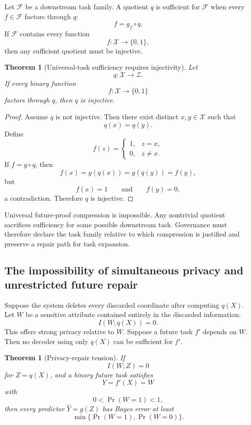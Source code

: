 \documentclass[11pt]{article}
\newtheorem{theorem}[definition]{Theorem}
\theoremstyle{definition}
\DeclareMathOperator{\Prob}{Pr}
\begin{document}
Let \(\mathcal{F}\) be a downstream task family. A quotient \(q\) is sufficient for \(\mathcal{F}\) when every \(f\in\mathcal{F}\) factors through \(q\):
\[
f=g_f\circ q.
\]
If \(\mathcal{F}\) contains every function
\[
f:\mathcal{X}\to\{0,1\},
\]
then any sufficient quotient must be injective.

\begin{theorem}[Universal-task sufficiency requires injectivity]
Let
\[
q:\mathcal{X}\to\mathcal{Z}.
\]
If every binary function
\[
f:\mathcal{X}\to\{0,1\}
\]
factors through \(q\), then \(q\) is injective.
\end{theorem}

\begin{proof}
Assume \(q\) is not injective. Then there exist distinct \(x,y\in\mathcal{X}\) such that
\[
q(x)=q(y).
\]
Define
\[
f(z)
=
\begin{cases}
1,&z=x,\\
0,&z\neq x.
\end{cases}
\]
If \(f=g\circ q\), then
\[
f(x)=g(q(x))=g(q(y))=f(y),
\]
but
\[
f(x)=1
\qquad\text{and}\qquad
f(y)=0,
\]
a contradiction. Therefore \(q\) is injective.
\end{proof}

Universal future-proof compression is impossible. Any nontrivial quotient sacrifices sufficiency for some possible downstream task. Governance must therefore declare the task family relative to which compression is justified and preserve a repair path for task expansion.

\subsection{The impossibility of simultaneous privacy and unrestricted future repair}

Suppose the system deletes every discarded coordinate after computing \(q(X)\). Let \(W\) be a sensitive attribute contained entirely in the discarded information:
\[
I(W;q(X))=0.
\]
This offers strong privacy relative to \(W\). Suppose a future task \(f'\) depends on \(W\). Then no decoder using only \(q(X)\) can be sufficient for \(f'\).

\begin{theorem}[Privacy-repair tension]
If
\[
I(W;Z)=0
\]
for \(Z=q(X)\), and a binary future task satisfies
\[
Y=f'(X)=W
\]
with
\[
0<\Prob(W=1)<1,
\]
then every predictor \(\widehat Y=g(Z)\) has Bayes error at least
\[
\min\{\Prob(W=1),\Prob(W=0)\}.
\]
\end{theorem}
\end{document}
